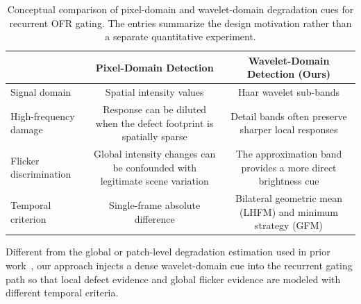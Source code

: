 \begin{table}[H]
\caption{Conceptual comparison of pixel-domain and wavelet-domain degradation cues for recurrent OFR gating. The entries summarize the design motivation rather than a separate quantitative experiment.\label{tab:feature_comparison}}
\begin{tabularx}{\textwidth}{lCC}
\toprule
& \textbf{Pixel-Domain Detection} & \textbf{Wavelet-Domain Detection (Ours)} \\
\midrule
Signal domain          & Spatial intensity values & Haar wavelet sub-bands \\
High-frequency damage  & Response can be diluted when the defect footprint is spatially sparse & Detail bands often preserve sharper local responses \\
Flicker discrimination & Global intensity changes can be confounded with legitimate scene variation & The approximation band provides a more direct brightness cue \\
Temporal criterion     & Single-frame absolute difference & Bilateral geometric mean (LHFM) and minimum strategy (GFM) \\
\bottomrule
\end{tabularx}
\end{table}

Different from the global or patch-level degradation estimation used in prior work~\cite{li2022airnet,potlapalli2023promptir,mao2025mambaofr}, our approach injects a dense wavelet-domain cue into the recurrent gating path so that local defect evidence and global flicker evidence are modeled with different temporal criteria.
